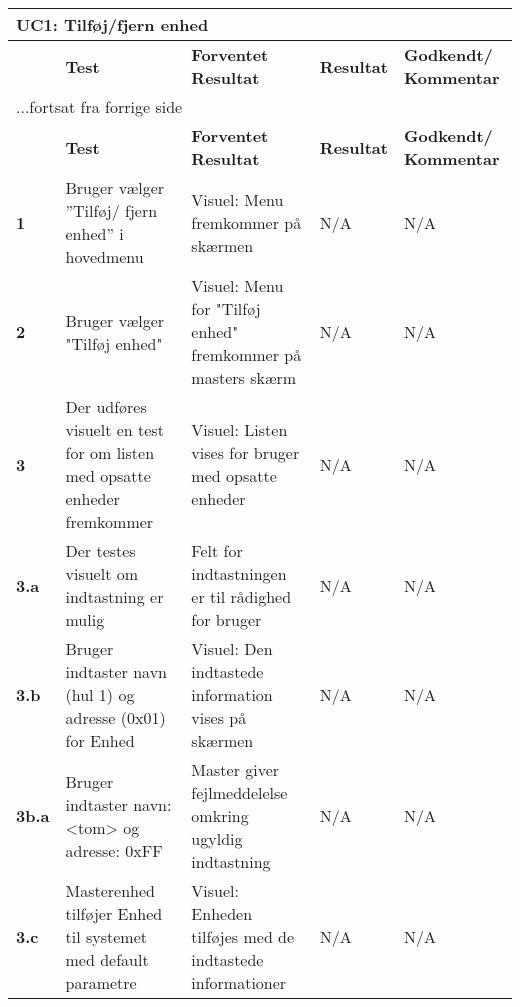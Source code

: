 \begin{center}
\begin{longtable}{|p{}|p{}|p{}|p{}|p{}|} %
\hline
\multicolumn{5}{|l|}{\textbf{UC1: Tilføj/fjern enhed}} \\ \hline
\multicolumn{1}{|c|}{} &
\textbf{Test} &
\textbf{Forventet \newline Resultat} &
\textbf{Resultat} &
\textbf{Godkendt/ \newline Kommentar} \\ \hline 
\endfirsthead

\multicolumn{5}{l}{...fortsat fra forrige side} \\ \hline 
\multicolumn{1}{|c|}{} &
\textbf{Test} &
\textbf{Forventet \newline Resultat} &
\textbf{Resultat} &
\textbf{Godkendt/ \newline Kommentar} \\ \hline 
\endhead


\textbf{1}	&Bruger vælger ''Tilføj/ fjern enhed'' i hovedmenu 
			&Visuel: Menu fremkommer på skærmen 
			&N/A 
			&N/A \\\hline
			 
\textbf{2}	&Bruger vælger "Tilføj enhed" 
			&Visuel: Menu for "Tilføj enhed" fremkommer på masters skærm  
			&N/A 
			&N/A \\\hline
			 
\textbf{3}	&Der udføres visuelt en test for om listen med opsatte enheder fremkommer
			&Visuel: Listen vises for bruger med opsatte enheder
			&N/A 
			&N/A \\\hline
			 
\textbf{3.a}	&Der testes visuelt om indtastning er mulig
			&Felt for indtastningen er til rådighed for bruger
			&N/A
			&N/A \\\hline 
			
\textbf{3.b}&Bruger indtaster navn (hul 1) og adresse (0x01) for Enhed
			&Visuel: Den indtastede information vises på skærmen 
			&N/A 
			&N/A \\\hline
			 
\textbf{3b.a}&Bruger indtaster navn: <tom> og adresse: 0xFF
			&Master giver fejlmeddelelse omkring ugyldig indtastning
			&N/A 
			&N/A \\\hline
						 
\textbf{3.c}&Masterenhed tilføjer Enhed til systemet med default parametre
			&Visuel: Enheden tilføjes med de indtastede informationer
			&N/A 
			&N/A \\\hline
			 

\end{longtable}
\end{center}
